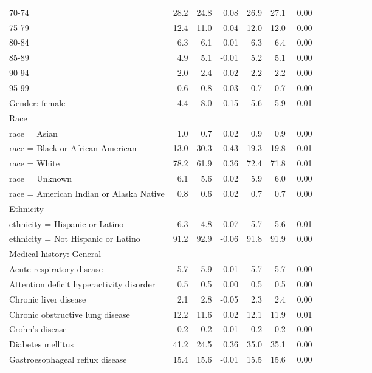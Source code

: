 \documentclass[11pt,]{article}
\begin{document}
\begin{longtable}{lrrrrrrrrrrrr}
      70-74 & 28.2 & 24.8 &  0.08 & 26.9 & 27.1 &  0.00 \\ 
      75-79 & 12.4 & 11.0 &  0.04 & 12.0 & 12.0 &  0.00 \\ 
      80-84 &  6.3 &  6.1 &  0.01 &  6.3 &  6.4 &  0.00 \\ 
      85-89 &  4.9 &  5.1 & -0.01 &  5.2 &  5.1 &  0.00 \\ 
      90-94 &  2.0 &  2.4 & -0.02 &  2.2 &  2.2 &  0.00 \\ 
      95-99 &  0.6 &  0.8 & -0.03 &  0.7 &  0.7 &  0.00 \\ 
  Gender: female &  4.4 &  8.0 & -0.15 &  5.6 &  5.9 & -0.01 \\ 
  Race &    &    &     &    &    &     \\ 
      race = Asian &  1.0 &  0.7 &  0.02 &  0.9 &  0.9 &  0.00 \\ 
      race = Black or African American & 13.0 & 30.3 & -0.43 & 19.3 & 19.8 & -0.01 \\ 
      race = White & 78.2 & 61.9 &  0.36 & 72.4 & 71.8 &  0.01 \\ 
      race = Unknown &  6.1 &  5.6 &  0.02 &  5.9 &  6.0 &  0.00 \\ 
      race = American Indian or Alaska Native &  0.8 &  0.6 &  0.02 &  0.7 &  0.7 &  0.00 \\ 
  Ethnicity &    &    &     &    &    &     \\ 
      ethnicity = Hispanic or Latino &  6.3 &  4.8 &  0.07 &  5.7 &  5.6 &  0.01 \\ 
      ethnicity = Not Hispanic or Latino & 91.2 & 92.9 & -0.06 & 91.8 & 91.9 &  0.00 \\ 
  Medical history: General &    &    &     &    &    &     \\ 
      Acute respiratory disease &  5.7 &  5.9 & -0.01 &  5.7 &  5.7 &  0.00 \\ 
      Attention deficit hyperactivity disorder &  0.5 &  0.5 &  0.00 &  0.5 &  0.5 &  0.00 \\ 
      Chronic liver disease &  2.1 &  2.8 & -0.05 &  2.3 &  2.4 &  0.00 \\ 
      Chronic obstructive lung disease & 12.2 & 11.6 &  0.02 & 12.1 & 11.9 &  0.01 \\ 
      Crohn's disease &  0.2 &  0.2 & -0.01 &  0.2 &  0.2 &  0.00 \\ 
      Diabetes mellitus & 41.2 & 24.5 &  0.36 & 35.0 & 35.1 &  0.00 \\ 
      Gastroesophageal reflux disease & 15.4 & 15.6 & -0.01 & 15.5 & 15.6 &  0.00 \\ 

\end{longtable}
\end{document}
